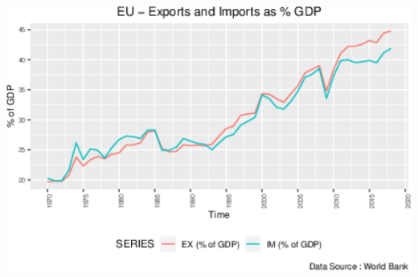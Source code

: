 \documentclass[11pt,preprint, authoryear]{elsarticle}
\let\origfigure\figure
\let\endorigfigure\endfigure
\renewenvironment{figure}[1][2] {
    \expandafter\origfigure\expandafter[H]
} {
    \endorigfigure
}
\numberwithin{equation}{section}
\numberwithin{figure}{section}
\numberwithin{table}{section}
\begin{document}
\begin{figure}[H]

{\centering \includegraphics{tradedynamics1_files/figure-latex/Graph8-1} 

}

\caption{Europe Export and Import Growth \label{Graph8}}\label{fig:Graph8}
\end{figure}
\end{document}
